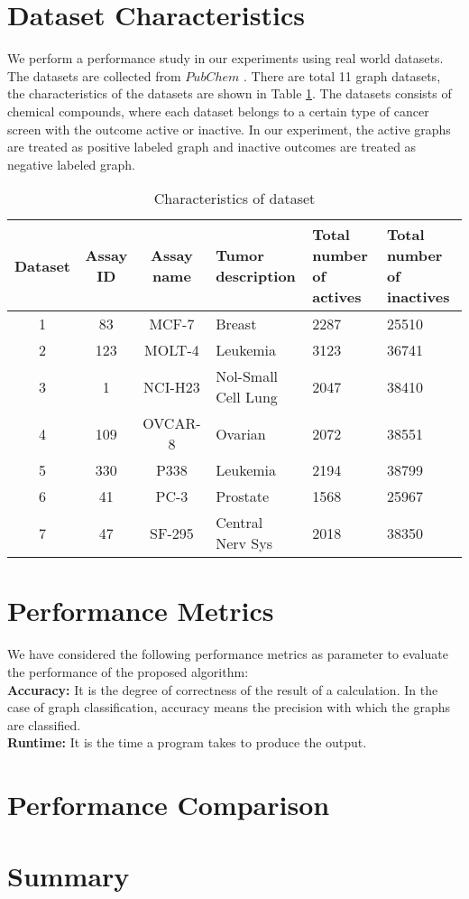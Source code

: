 \section{Dataset Characteristics}
%
We perform a performance study in our experiments using real world datasets. The datasets are collected from $PubChem$ \cite{pubchem}. There are total 11 graph datasets, the characteristics of the datasets are shown in Table \ref{table:dataset}.  The datasets consists of chemical compounds, where each dataset belongs to a certain type of cancer screen with the outcome active or inactive.  In our experiment,  the active graphs are treated as positive labeled graph and inactive outcomes are treated as negative labeled graph.
%
\begin{center}
\begin{table}[htbp]
\begin{tabular}{|c|c|c|m{3cm}|m{2cm}|m{2cm}|}
  \hline
 \normalsize Dataset & Assay ID & Assay name & Tumor description & Total number of actives & Total number of inactives\\
  \hline
  1 & 83 & MCF-7 & Breast & 2287 & 25510 \\
  \hline
  2 & 123 & MOLT-4 & Leukemia & 3123 & 36741 \\
  \hline
  3 & 1 & NCI-H23 & Nol-Small Cell Lung & 2047 & 38410 \\
  \hline
  4 & 109 & OVCAR-8 & Ovarian & 2072 & 38551 \\
  \hline
  5 & 330 & P338 & Leukemia & 2194 & 38799 \\
  \hline
  6 & 41 & PC-3 & Prostate & 1568 & 25967 \\
  \hline
  7 & 47 & SF-295 & Central Nerv Sys & 2018 & 38350 \\
  \hline
\end{tabular}
\caption{Characteristics of dataset} \label{table:dataset}
\end{table}
\end{center}
%
\section{Performance Metrics}
%
We have considered the following performance metrics as parameter to evaluate the performance of the proposed algorithm:\\
\textbf{Accuracy:} It is the degree of correctness of the result of a calculation. In the case of graph classification, accuracy means the precision with which the graphs are classified.\\
\textbf{Runtime:} It is the time a program takes to produce the output.
%
\section{Performance Comparison}
%
%
\section{Summary}
%

